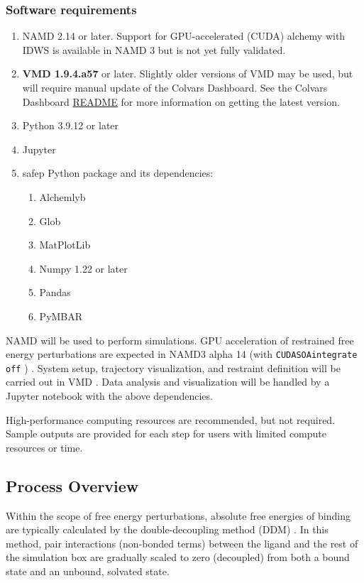 \documentclass[9pt,tutorial]{Styling/livecoms}
\newcommand{\textInput}[1]{
  \texttt{#1}
}
\begin{document}
\subsubsection{Software requirements}\label{sec:7.2}
    \begin{enumerate}
        \item NAMD 2.14 or later. Support for GPU-accelerated (CUDA) alchemy with IDWS is available in NAMD 3 but is not yet fully validated.
        \item \textbf{VMD 1.9.4.a57} or later. Slightly older versions of VMD may be used, but will require manual update of the Colvars Dashboard. See the Colvars Dashboard \href{https://github.com/Colvars/colvars/tree/master/vmd/cv_dashboard}{README} for more information on getting the latest version. 
        \item Python 3.9.12 or later
        \item Jupyter
        \item safep Python package and its dependencies:
        \begin{enumerate}
        \item Alchemlyb
        \item Glob
        \item MatPlotLib
        \item Numpy 1.22 or later
        \item Pandas
        \item PyMBAR
        \end{enumerate}
    \end{enumerate}

NAMD will be used to perform simulations. GPU acceleration of restrained free energy perturbations are expected in NAMD3 alpha 14 (with \textInput{CUDASOAintegrate off}) \cite{Chen2020, Phillips2020}. System setup, trajectory visualization, and restraint definition will be carried out in VMD \cite{Humphrey1996}. Data analysis and visualization will be handled by a Jupyter notebook with the above dependencies.

High-performance computing resources are recommended, but not required. Sample outputs are provided for each step for users with limited compute resources or time.

\subsection{Process Overview} \label{sec:processOverview}

Within the scope of free energy perturbations, absolute free energies of binding are typically calculated by the double-decoupling method (DDM) \cite{Gilson1997, Hamelberg2004, Woo2005}. 
In this method, pair interactions (non-bonded terms) between the ligand and the rest of the simulation box are gradually scaled to zero (decoupled) from both a bound state and an unbound, solvated state.
\end{document}
